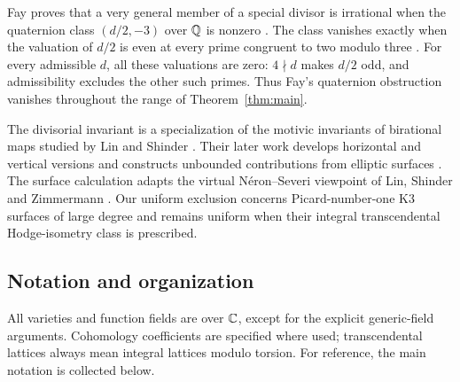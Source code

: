 Fay proves that a very general member of a special divisor is irrational
when the quaternion class \((d/2,-3)\) over \(\mathbb Q\) is nonzero
\cite[Theorem~1.1]{Fay26}.
The class vanishes exactly when the valuation of \(d/2\) is even
at every prime congruent to two modulo three
\cite[condition~\((**')\)]{Fay26}.
For every admissible \(d\), all these valuations are zero: \(4\nmid d\)
makes \(d/2\) odd, and admissibility excludes the other such primes.
Thus Fay's quaternion obstruction vanishes throughout the range of
Theorem~\ref{thm:main}.

The divisorial invariant is a specialization of the motivic invariants of
birational maps studied by Lin and Shinder \cite{LinShinder24}.
Their later work develops horizontal and vertical versions
\cite[Definition~2.3 and Lemmas~2.4--2.5]{LinShinder26} and constructs
unbounded contributions from elliptic surfaces
\cite[Theorem~1.2 and Section~4]{LinShinder26}.
The surface calculation adapts the virtual
N\'eron--Severi viewpoint of Lin, Shinder and Zimmermann
\cite[Definition~5.2 and Proposition~5.5]{LinShinderZimmermann23}.
Our uniform exclusion concerns Picard-number-one K3 surfaces of large
degree and remains uniform when their integral transcendental
Hodge-isometry class is prescribed.

\subsection{Notation and organization}

All varieties and function fields are over \(\mathbb C\), except for the
explicit generic-field arguments. Cohomology coefficients are
specified where used; transcendental lattices always mean integral
lattices modulo torsion. For reference, the main notation is collected below.

